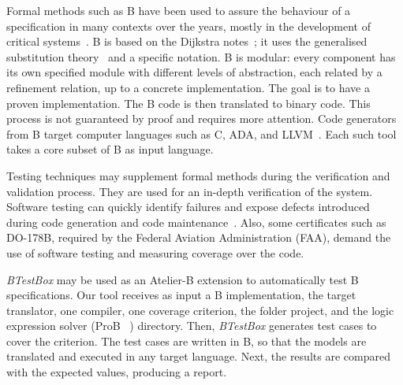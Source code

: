 \documentclass[runningheads]{llncs}
\begin{document}

Formal methods such as B have been used to assure the behaviour of a specification in many contexts over the years, mostly in the development of critical systems~\cite{leuschel:2005,valerio_thesis:2016}. 
B is based on the Dijkstra notes~\cite{dijkstra1976discipline}; it uses the generalised substitution theory~\cite{hoare2002proof} and a specific notation. 
B is modular:  every component has its own specified module with different levels of abstraction, each related by a refinement relation, up to a concrete implementation. 
The goal is to have a proven implementation. 
The B code is then translated to binary code.
This process is not guaranteed by proof and requires more attention. 
Code generators from B target computer languages such as C, ADA, and LLVM~\cite{deharbebtestbox}. 
Each such tool takes a core subset of B as input language. 




Testing techniques may supplement formal methods during the verification and validation process. 
They are used for an in-depth verification of the system. 
Software testing can quickly identify failures and expose defects introduced during code generation and code maintenance~\cite{deharbebtestbox}. 
Also, some certificates such as DO-178B, required by the Federal Aviation Administration (FAA), demand the use of software testing and measuring coverage over the code.

 \textit{BTestBox} may be used as an Atelier-B extension to automatically test B specifications. 
Our tool receives as input a B implementation, the target translator, one compiler, one coverage criterion, the folder project, and the logic expression solver (ProB ~\cite{1_leuschel_2017}) %
directory. 
Then,  \textit{BTestBox} generates test cases to cover the criterion.
The test cases are written in B, so that the models are translated and executed in any target language. 
Next, the results are compared with the expected values, producing a report. 
\end{document}

